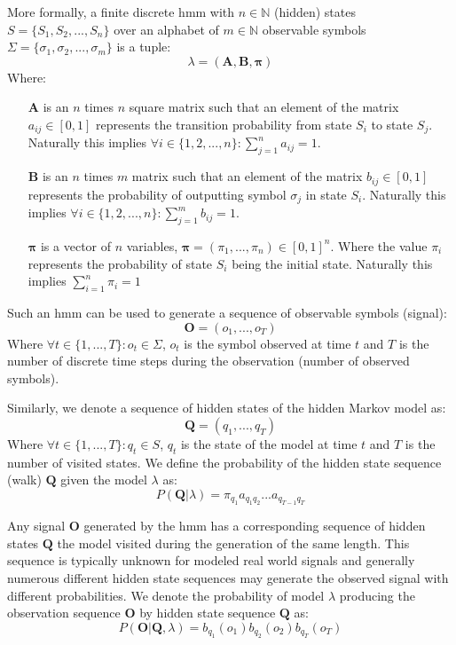 More formally, a finite discrete \acrlong{hmm} with $n \in \mathbb{N}$ (hidden) states $S = \{S_1, S_2, ..., S_n\}$ over an alphabet of $m \in \mathbb{N}$ observable symbols $\Sigma=\{\sigma_1, \sigma_2, ..., \sigma_m\}$ is a tuple: $$\lambda = (\mathbf{A}, \mathbf{B}, \boldsymbol{\pi})$$
Where:
\begin{itemize}
	\item[$\mathbf{A}$] is an $n$ times $n$ square matrix such that an element of the matrix ${a_{ij} \in [0, 1]}$ represents the transition probability from state $S_i$ to state $S_j$. Naturally this implies ${\forall i \in \{1, 2, ..., n\}: \sum_{j=1}^n{a_{ij}} = 1}$.
	\item[$\mathbf{B}$] is an $n$ times $m$ matrix such that an element of the matrix ${b_{ij} \in [0, 1]}$ represents the probability of outputting symbol $\sigma_j$ in state $S_i$. Naturally this implies ${\forall i \in \{1, 2, ..., n\}: \sum_{j=1}^m{b_{ij}} = 1}$.
	\item[$\boldsymbol{\pi}$] is a vector of $n$ variables, ${\boldsymbol{\pi}=(\pi_1, ..., \pi_n) \in [0, 1]^n}$. Where the value $\pi_i$ represents the probability of state $S_i$ being the initial state. Naturally this implies ${\sum_{i=1}^n{\pi_i} = 1}$
\end{itemize}

Such an \gls{hmm} can be used to generate a sequence of observable symbols (signal): $$\mathbf{O} = (o_1, ..., o_T)$$
Where ${\forall t \in \{1, ..., T\}: o_t \in \Sigma}$, $o_t$ is the symbol observed at time $t$ and $T$ is the number of discrete time steps during the observation (number of observed symbols).

Similarly, we denote a sequence of hidden states of the hidden Markov model as: $$\mathbf{Q} = (q_1, ..., q_T)$$
Where ${\forall t \in \{1, ..., T\}: q_t \in S}$, $q_t$ is the state of the model at time $t$ and $T$ is the number of visited states.
We define the probability of the hidden state sequence (walk) $\mathbf{Q}$ given the model $\lambda$ as:
$$P(\mathbf{Q}|\lambda) = \pi_{q_1}a_{q_1q_2}...a_{q_{T-1}q_T}$$

Any signal $\mathbf{O}$ generated by the \gls{hmm} has a corresponding sequence of hidden states $\mathbf{Q}$ the model visited during the generation of the same length. This sequence is typically unknown for modeled real world signals and generally numerous different hidden state sequences may generate the observed signal with different probabilities. We denote the probability of model $\lambda$ producing the observation sequence $\mathbf{O}$ by hidden state sequence $\mathbf{Q}$ as:
$$P(\mathbf{O}|\mathbf{Q},\lambda) = b_{q_1}(o_1)b_{q_2}(o_2)b_{q_T}(o_T)$$

